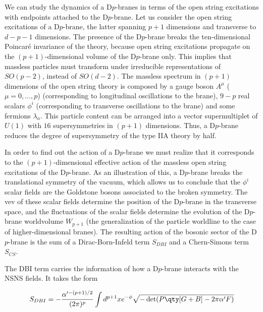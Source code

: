 We can study the dynamics of a D$p$-branes in terms of the open string excitations  with endpoints
attached to the D$p$-brane.
Let us consider the open string excitations of a D$p$-brane, the latter spanning $p+1$ dimensions and transverse to $d-p-1$ dimensions.
The presence of the D$p$-brane breaks the ten-dimensional Poincaré invariance of the theory, because
open string excitations propagate on the $(p+1)$-dimensional volume of the D$p$-brane only.
This implies that massless particles must transform under irreducible representations of $SO(p-2)$, instead of
$SO(d-2)$.
The massless spectrum in $(p+1)$ dimensions of the open string theory is composed by a gauge boson $A^\mu$ ($\mu=0,\ldots,p$) (corresponding
to longitudinal oscillations to the brane),
$9-p$ real scalars $\phi^i$ (corresponding to transverse oscillations to the brane) and some fermions $\lambda_a$.
This particle content can be arranged into a vector supermultiplet of $U(1)$ with $16$ supersymmetries
in $(p+1)$ dimensions. 
Thus, a D$p$-brane reduces the degree of supersymmetry of the type IIA theory by half.

In order to find out the action of a D$p$-brane we must realize that it corresponds to the
$(p+1)$-dimensional effective action of the massless open string excitations of the D$p$-brane.
As an illustration of this, a D$p$-brane breaks the translational symmetry of the vacuum, which allows
us to conclude that the $\phi^i$ scalar fields are the Goldstone bosons associated to the broken symmetry. 
The vev of these scalar fields determine the position of the D$p$-brane in the transverse space, and the fluctuations of the scalar
fields determine the evolution of the D$p$-brane worldvolume $W_{p+1}$ (the generalization of the particle worldline to the case of higher-dimensional branes). 
The resulting action of the bosonic sector of the D$p$-brane is the sum of a Dirac-Born-Infeld term $S_{DBI}$ and a Chern-Simons term $S_{CS}$.

The DBI term carries the information of how a D$p$-brane interacts with the NSNS fields. 
It takes the form

%

\begin{equation}
  S_{DBI}= -\frac{\alpha'^{-(p+1)/2}}{(2\pi)^p} \int d^{p+1} x e^{-\phi} \sqrt{-\det(P\qty[G+B]-2\pi \alpha'F)}
\end{equation}

